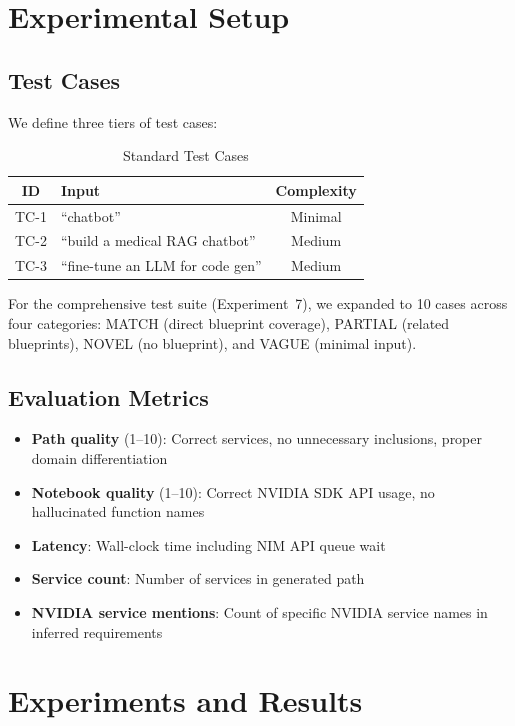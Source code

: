 \documentclass[conference]{IEEEtran}
\begin{document}
\section{Experimental Setup}

\subsection{Test Cases}

We define three tiers of test cases:

\begin{table}[h]
\centering
\caption{Standard Test Cases}
\label{tab:testcases}
\begin{tabular}{@{}clc@{}}
\toprule
\textbf{ID} & \textbf{Input} & \textbf{Complexity} \\
\midrule
TC-1 & ``chatbot'' & Minimal \\
TC-2 & ``build a medical RAG chatbot'' & Medium \\
TC-3 & ``fine-tune an LLM for code gen'' & Medium \\
\bottomrule
\end{tabular}
\end{table}

For the comprehensive test suite (Experiment~7), we expanded to 10 cases across four categories: MATCH (direct blueprint coverage), PARTIAL (related blueprints), NOVEL (no blueprint), and VAGUE (minimal input).

\subsection{Evaluation Metrics}

\begin{itemize}
    \item \textbf{Path quality} (1--10): Correct services, no unnecessary inclusions, proper domain differentiation
    \item \textbf{Notebook quality} (1--10): Correct NVIDIA SDK API usage, no hallucinated function names
    \item \textbf{Latency}: Wall-clock time including NIM API queue wait
    \item \textbf{Service count}: Number of services in generated path
    \item \textbf{NVIDIA service mentions}: Count of specific NVIDIA service names in inferred requirements
\end{itemize}

\section{Experiments and Results}
\end{document}
